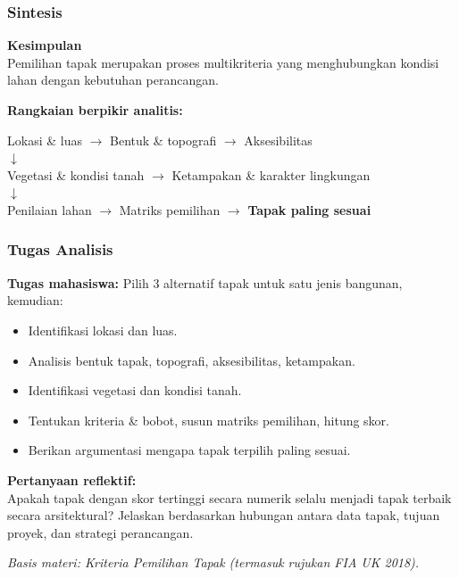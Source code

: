 \documentclass[../main.tex]{subfiles}
\begin{document}
\begin{frame}[mytitle=center, c, mycolor=digiPH_darkorange, dark]
	\frametitle{Sintesis}

	\textbf{Kesimpulan}\\
	Pemilihan tapak merupakan proses multikriteria yang menghubungkan kondisi lahan dengan kebutuhan perancangan.

	\vspace{0.4cm}
	\textbf{Rangkaian berpikir analitis:}
	\begin{center}
		Lokasi \& luas $\rightarrow$ Bentuk \& topografi $\rightarrow$ Aksesibilitas \\
		$\downarrow$ \\
		Vegetasi \& kondisi tanah $\rightarrow$ Ketampakan \& karakter lingkungan \\
		$\downarrow$ \\
		Penilaian lahan $\rightarrow$ Matriks pemilihan $\rightarrow$ \textbf{Tapak paling sesuai}
	\end{center}
\end{frame}

\begin{frame}[mytitle=standard, t, mycolor=digiPH_white, light]
	\frametitle{Tugas Analisis}

	\textbf{Tugas mahasiswa:} Pilih 3 alternatif tapak untuk satu jenis bangunan, kemudian:
	\begin{itemize}
		\item Identifikasi lokasi dan luas.
		\item Analisis bentuk tapak, topografi, aksesibilitas, ketampakan.
		\item Identifikasi vegetasi dan kondisi tanah.
		\item Tentukan kriteria \& bobot, susun matriks pemilihan, hitung skor.
		\item Berikan argumentasi mengapa tapak terpilih paling sesuai.
	\end{itemize}

	\vspace{0.3cm}
	\textbf{Pertanyaan reflektif:}\\
	Apakah tapak dengan skor tertinggi secara numerik selalu menjadi tapak terbaik secara arsitektural? Jelaskan berdasarkan hubungan antara data tapak, tujuan proyek, dan strategi perancangan.

	\vspace{0.2cm}
	\footnotesize{\textit{Basis materi: Kriteria Pemilihan Tapak (termasuk rujukan FIA UK 2018).}}
\end{frame}


\end{document}
